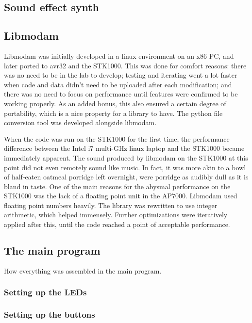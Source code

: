 
\subsection{Sound effect synth}

\subsection{Libmodam}

Libmodam was initially developed in a linux environment on an x86 PC, and later ported to avr32 and the STK1000.
This was done for comfort reasons: there was no need to be in the lab to develop; testing and iterating went a lot faster when code and data didn't need to be uploaded after each modification; and there was no need to focus on performance until features were confirmed to be working properly.
As an added bonus, this also ensured a certain degree of portability, which is a nice property for a library to have.
The python file conversion tool was developed alongside libmodam.

When the code was run on the STK1000 for the first time, the performance difference between the Intel i7 multi-GHz linux laptop and the STK1000 became immediately apparent.
The sound produced by libmodam on the STK1000 at this point did not even remotely sound like music.
In fact, it was more akin to a bowl of half-eaten oatmeal porridge left overnight, were porridge as audibly dull as it is bland in taste.
One of the main reasons for the abysmal performance on the STK1000 was the lack of a floating point unit in the AP7000.
Libmodam used floating point numbers heavily.
The library was rewritten to use integer arithmetic, which helped immensely.
Further optimizations were iteratively applied after this, until the code reached a point of acceptable performance.

\subsection{The main program}

How everything was assembled in the main program.

\subsubsection{Setting up the LEDs}
\subsubsection{Setting up the buttons}
